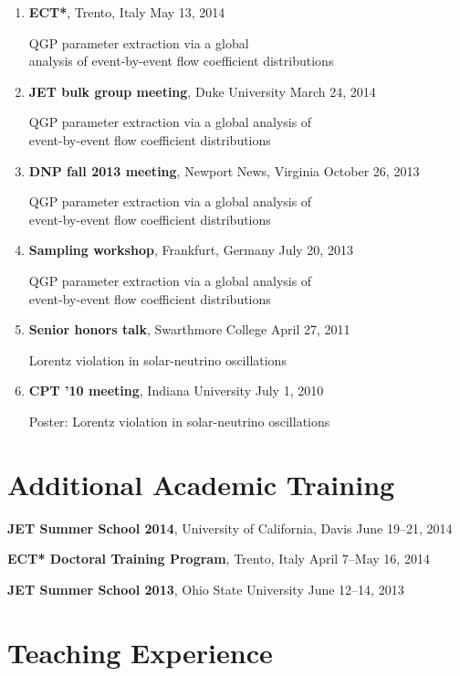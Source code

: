 \documentclass[letterpaper,10pt]{article}
\newcommand{\entry}[3]{\vspace{.5em plus .1em minus .1em}\textbf{#1}, #2 \hfill #3}
\begin{document}
\begin{enumerate}
  \item \entry{ECT*}{Trento, Italy}{May 13, 2014} \par
    QGP parameter extraction via a global \\
    analysis of event-by-event flow coefficient distributions

  \item \entry{JET bulk group meeting}{Duke University}{March 24, 2014} \par
    QGP parameter extraction via a global analysis of \\
    event-by-event flow coefficient distributions

  \item \entry{DNP fall 2013 meeting}{Newport News, Virginia}{October 26, 2013} \par
    QGP parameter extraction via a global analysis of \\
    event-by-event flow coefficient distributions

  \item \entry{Sampling workshop}{Frankfurt, Germany}{July 20, 2013} \par
    QGP parameter extraction via a global analysis of \\
    event-by-event flow coefficient distributions

  \item \entry{Senior honors talk}{Swarthmore College}{April 27, 2011} \par
    Lorentz violation in solar-neutrino oscillations

  \item \entry{CPT '10 meeting}{Indiana University}{July 1, 2010} \par
    Poster: Lorentz violation in solar-neutrino oscillations
\end{enumerate}


\section{Additional Academic Training}

\entry{JET Summer School 2014}{University of California, Davis}{June 19--21, 2014}

\entry{ECT* Doctoral Training Program}{Trento, Italy}{April 7--May 16, 2014}

\entry{JET Summer School 2013}{Ohio State University}{June 12--14, 2013}


\section{Teaching Experience}
\end{document}
